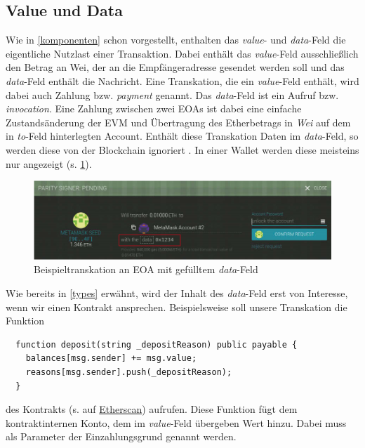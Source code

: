 \documentclass[runningheads]{llncs}
\begin{document}
\subsection{Value und Data}
\label{valData}
Wie in \ref{komponenten} schon vorgestellt, enthalten das \textit{value}- und \textit{data}-Feld die eigentliche Nutzlast einer Transaktion. Dabei enthält das \textit{value}-Feld ausschließlich den Betrag an Wei, der an die Empfängeradresse gesendet werden soll und das \textit{data}-Feld enthält die Nachricht.
Eine Transkation, die ein \textit{value}-Feld enthält, wird dabei auch Zahlung bzw. \textit{payment} genannt. Das \textit{data}-Feld ist ein Aufruf bzw. \textit{invocation}\cite[S.108]{antonopoulos_mastering_2019}. Eine Zahlung zwischen zwei EOAs ist dabei eine einfache Zustandsänderung der EVM und Übertragung des Etherbetrags in \textit{Wei} auf dem in \textit{to}-Feld hinterlegten Account. Enthält diese Transkation Daten im \textit{data}-Feld, so werden diese von der Blockchain ignoriert \cite[S.10]{wood_ethereum/yellowpaper_2019}. In einer Wallet werden diese meisteins nur angezeigt (s. \ref{fig:dataTransaction}).
\begin{figure}[h!]
  \includegraphics[width=\textwidth, keepaspectratio]{dataTransaction.png}
  \caption{Beispieltranskation an EOA mit gefülltem \textit{data}-Feld \cite[S.109]{antonopoulos_mastering_2019}}
  \label{fig:dataTransaction}
\end{figure}

Wie bereits in \ref{types} erwähnt, wird der Inhalt des \textit{data}-Feld erst von Interesse, wenn wir einen Kontrakt ansprechen.
Beispielsweise soll unsere Transkation die Funktion
\begin{verbatim}
  function deposit(string _depositReason) public payable {
    balances[msg.sender] += msg.value;
    reasons[msg.sender].push(_depositReason);
  }
\end{verbatim}
des Kontrakts (s. auf \href{https://ropsten.etherscan.io/address/0xd76595f64aaf9a79f27cf6831788f7575f0c7f38#code}{Etherscan}) aufrufen. Diese Funktion fügt dem kontraktinternen Konto, dem im \textit{value}-Feld übergeben Wert hinzu. Dabei muss als Parameter der Einzahlungsgrund genannt werden.
\end{document}
